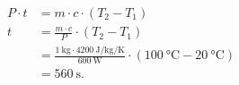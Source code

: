 \begin{mdframed}[style=mdexam]
\begin{example}
    \begin{align*}
      P\cdot t &= m\cdot c\cdot(T_2 - T_1)                                               \\
             t &= \frac{m\cdot c}{P}\cdot(T_2 - T_1)                                     \\     
               &= \frac{\SI{1}{\kg}\cdot\SI{4200}{\joule\per\kg\per\K}}{\SI{600}{\W}}
                \cdot(\SI{100}{\degreeCelsius} - \SI{20}{\degreeCelsius})                \\ 
               &= \SI{560}{\s}.
    \end{align*}         
  \end{example}
\end{mdframed}